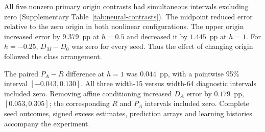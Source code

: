 {All five nonzero primary origin contrasts had simultaneous intervals excluding zero (Supplementary Table~\ref{tab:neural-contrasts}). The midpoint reduced error relative to the zero origin in both nonlinear configurations. The upper origin increased error by $9.379$~pp at $h=0.5$ and decreased it by $1.445$~pp at $h=1$. For $h=-0.25$, $D_M-D_0$ was zero for every seed. Thus the effect of changing origin followed the class arrangement.

The paired $P_A-R$ difference at $h=1$ was $0.044$~pp, with a pointwise 95\% interval $[-0.043,0.130]$. All three width-15 versus width-64 diagnostic intervals included zero. Removing affine conditioning increased $D_A$ error by $0.179$~pp, $[0.053,0.305]$; the corresponding $R$ and $P_A$ intervals included zero. Complete seed outcomes, signed excess estimates, prediction arrays and learning histories accompany the experiment.

\HalfMoonMainRiskTable

}

\newcommand{\HalfMoonMainRiskTable}{%
\begin{table}[t]
\centering\small
\setlength{\tabcolsep}{3pt}
\caption{Population Bayes risk and neural test error. Errors are mean $\pm$ sample SD over ten seeds; excess is mean error minus Bayes risk. Risk and error are percentages; excess is in percentage points. $R$ denotes raw coordinates, $D$ direction, and $P$ direction plus radius; subscripts $0$, $M$ and $A$ identify the zero, midpoint and upper origins.}
\label{tab:neural-main}
\begin{tabular}{rrrcr}
\toprule
$h$ & Input & Bayes risk & Test error & Excess \\
\midrule
$-0.25$ & $R$   & 0.0000 & $0.000\pm0.000$ & 0.000 \\
         & $D_0$ & 0.0000 & $0.000\pm0.000$ & 0.000 \\
         & $D_M$ & 0.0000 & $0.000\pm0.000$ & 0.000 \\
         & $D_A$ & 22.2934 & $22.528\pm0.176$ & 0.234 \\
         & $P_A$ & 0.0000 & $0.000\pm0.000$ & 0.000 \\
\addlinespace
$0.5$    & $R$   & 0.0000 & $0.000\pm0.000$ & 0.000 \\
         & $D_0$ & 11.8577 & $11.991\pm0.132$ & 0.134 \\
         & $D_M$ & 10.7479 & $10.835\pm0.140$ & 0.087 \\
         & $D_A$ & 21.1509 & $21.370\pm0.268$ & 0.219 \\
         & $P_A$ & 0.0000 & $0.000\pm0.000$ & 0.000 \\
\addlinespace
$1$      & $R$   & 6.7157 & $6.790\pm0.103$ & 0.074 \\
         & $D_0$ & 21.7294 & $22.201\pm0.375$ & 0.471 \\
         & $D_M$ & 20.8548 & $20.947\pm0.175$ & 0.092 \\
         & $D_A$ & 20.5987 & $20.755\pm0.316$ & 0.157 \\
         & $P_A$ & 6.7157 & $6.833\pm0.135$ & 0.118 \\
\bottomrule
\end{tabular}
\end{table}
}

